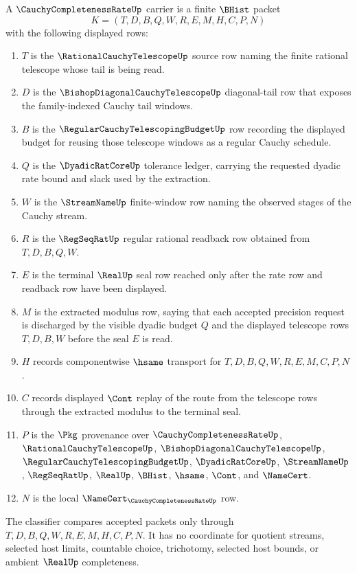 \begin{definition}
\label{def:cauchy-completeness-rate-carrier}
A $\CauchyCompletenessRateUp$ carrier is a finite $\BHist$ packet
$$
K=(T,D,B,Q,W,R,E,M,H,C,P,N)
$$
with the following displayed rows:
\begin{enumerate}
\item $T$ is the $\RationalCauchyTelescopeUp$ source row naming the finite rational telescope whose tail is being read.
\item $D$ is the $\BishopDiagonalCauchyTelescopeUp$ diagonal-tail row that exposes the family-indexed Cauchy tail windows.
\item $B$ is the $\RegularCauchyTelescopingBudgetUp$ row recording the displayed budget for reusing those telescope windows as a regular Cauchy schedule.
\item $Q$ is the $\DyadicRatCoreUp$ tolerance ledger, carrying the requested dyadic rate bound and slack used by the extraction.
\item $W$ is the $\StreamNameUp$ finite-window row naming the observed stages of the Cauchy stream.
\item $R$ is the $\RegSeqRatUp$ regular rational readback row obtained from $T,D,B,Q,W$.
\item $E$ is the terminal $\RealUp$ seal row reached only after the rate row and readback row have been displayed.
\item $M$ is the extracted modulus row, saying that each accepted precision request is discharged by the visible dyadic budget $Q$ and the displayed telescope rows $T,D,B,W$ before the seal $E$ is read.
\item $H$ records componentwise $\hsame$ transport for $T,D,B,Q,W,R,E,M,C,P,N$.
\item $C$ records displayed $\Cont$ replay of the route from the telescope rows through the extracted modulus to the terminal seal.
\item $P$ is the $\Pkg$ provenance over $\CauchyCompletenessRateUp$, $\RationalCauchyTelescopeUp$, $\BishopDiagonalCauchyTelescopeUp$, $\RegularCauchyTelescopingBudgetUp$, $\DyadicRatCoreUp$, $\StreamNameUp$, $\RegSeqRatUp$, $\RealUp$, $\BHist$, $\hsame$, $\Cont$, and $\NameCert$.
\item $N$ is the local $\NameCert_{\CauchyCompletenessRateUp}$ row.
\end{enumerate}
The classifier compares accepted packets only through $T,D,B,Q,W,R,E,M,H,C,P,N$. It has no coordinate for quotient streams, selected host limits, countable choice, trichotomy, selected host bounds, or ambient $\RealUp$ completeness.
\end{definition}

